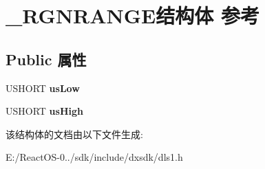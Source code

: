 \hypertarget{struct___r_g_n_r_a_n_g_e}{}\section{\+\_\+\+R\+G\+N\+R\+A\+N\+G\+E结构体 参考}
\label{struct___r_g_n_r_a_n_g_e}
\subsection*{Public 属性}
\begin{DoxyCompactItemize}
\item 
\mbox{\label{struct___r_g_n_r_a_n_g_e_a883fbca01336035c5df96a565d452739}} 
U\+S\+H\+O\+RT {\bfseries us\+Low}
\item 
\mbox{\label{struct___r_g_n_r_a_n_g_e_a2fd00feadca7d8dbee249b7cdca656d1}} 
U\+S\+H\+O\+RT {\bfseries us\+High}
\end{DoxyCompactItemize}


该结构体的文档由以下文件生成\+:\begin{DoxyCompactItemize}
\item 
E\+:/\+React\+O\+S-\/0../sdk/include/dxsdk/dls1.\+h\end{DoxyCompactItemize}
